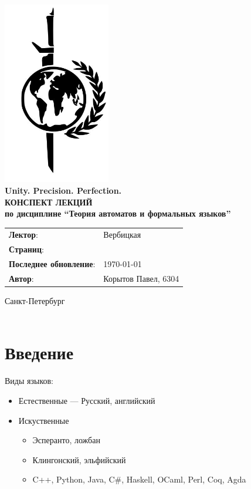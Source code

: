 \documentclass[a4paper, 14pt]{extarticle}
\begin{document}
\begin{titlepage}
    {\centering
        {\bfseries
            \includegraphics[height=8cm]{../res/logo.jpeg}\\
            Unity. Precision. Perfection.\\
            \vspace{3.5cm}
            \uppercase{Конспект лекций} \\
            по дисциплине \enquote{Теория автоматов и формальных языков}\\
        }
        \vspace{\fill}
    }
    \begin{tabular}{l l}
        \textbf{Лектор}: & Вербицкая\\
        \textbf{Страниц}: &\pageref{LastPage}\\
        \textbf{Последнее обновление}: & \today{}\\ 
        \textbf{Автор}: & Корытов Павел, 6304\\
    \end{tabular}

    \vspace{2cm}
    {\centering
        Санкт-Петербург \\
        \the\year\\
    }
\end{titlepage}

\tableofcontents
\newpage
\section{Введение}
Виды языков:
\begin{itemize}
    \item Естественные --- Русский, английский
    \item Искуственные
    \begin{itemize}
        \item Эсперанто, ложбан
        \item Клингонский, эльфийский
        \item C++, Python, Java, C\#, Haskell, OCaml, Perl, Coq, Agda
    \end{itemize}
\end{itemize}
\end{document}
